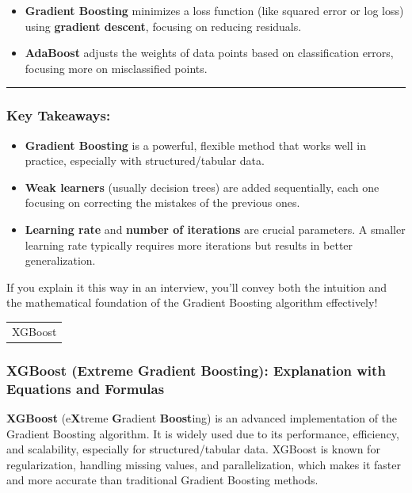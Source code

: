 \documentclass[12pt]{book}
\providecommand{\tightlist}{%
  \setlength{\itemsep}{0pt}\setlength{\parskip}{0pt}}
\begin{document}
\begin{itemize}
\tightlist
\item
  \textbf{Gradient Boosting} minimizes a loss function (like squared
  error or log loss) using \textbf{gradient descent}, focusing on
  reducing residuals.
\item
  \textbf{AdaBoost} adjusts the weights of data points based on
  classification errors, focusing more on misclassified points.
\end{itemize}

\begin{center}\rule{0.5\linewidth}{0.5pt}\end{center}

\subsubsection{Key Takeaways:}\label{key-takeaways}

\begin{itemize}
\tightlist
\item
  \textbf{Gradient Boosting} is a powerful, flexible method that works
  well in practice, especially with structured/tabular data.
\item
  \textbf{Weak learners} (usually decision trees) are added
  sequentially, each one focusing on correcting the mistakes of the
  previous ones.
\item
  \textbf{Learning rate} and \textbf{number of iterations} are crucial
  parameters. A smaller learning rate typically requires more iterations
  but results in better generalization.
\end{itemize}

If you explain it this way in an interview, you'll convey both the
intuition and the mathematical foundation of the Gradient Boosting
algorithm effectively!

\begin{longtable}[]{@{}l@{}}
\toprule\noalign{}
\endhead
\bottomrule\noalign{}
\endlastfoot
XGBoost \\
\end{longtable}

\subsubsection{XGBoost (Extreme Gradient Boosting): Explanation with
Equations and
Formulas}\label{xgboost-extreme-gradient-boosting-explanation-with-equations-and-formulas}

\textbf{XGBoost} (e\textbf{X}treme \textbf{G}radient \textbf{Boost}ing)
is an advanced implementation of the Gradient Boosting algorithm. It is
widely used due to its performance, efficiency, and scalability,
especially for structured/tabular data. XGBoost is known for
regularization, handling missing values, and parallelization, which
makes it faster and more accurate than traditional Gradient Boosting
methods.
\end{document}
